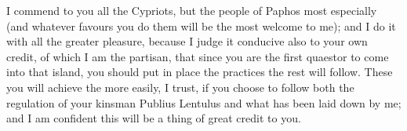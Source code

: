 

I commend to you all the Cypriots, but the people of Paphos most especially (and whatever favours you do them will be the most welcome to me); and I do it with all the greater pleasure, because I judge it conducive also to your own credit, of which I am the partisan, that since you are the first quaestor to come into that island, you should put in place the practices the rest will follow. These you will achieve the more easily, I trust, if you choose to follow both the regulation of your kinsman Publius Lentulus and what has been laid down by me; and I am confident this will be a thing of great credit to you.

